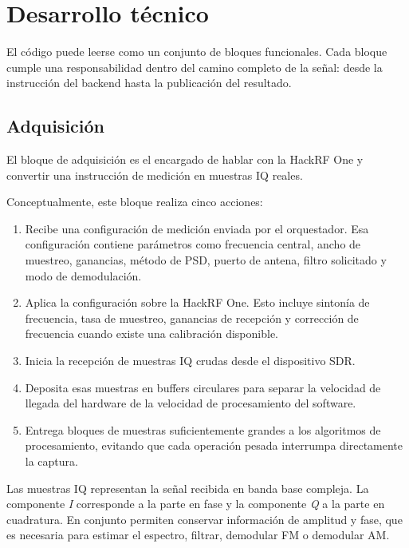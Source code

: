 \section{Desarrollo técnico}

El código puede leerse como un conjunto de bloques funcionales. Cada bloque cumple
una responsabilidad dentro del camino completo de la señal: desde la instrucción
del backend hasta la publicación del resultado.

\subsection{Adquisición}

El bloque de adquisición es el encargado de hablar con la HackRF One y convertir
una instrucción de medición en muestras IQ reales.

Conceptualmente, este bloque realiza cinco acciones:

\begin{enumerate}
  \item Recibe una configuración de medición enviada por el orquestador. Esa
  configuración contiene parámetros como frecuencia central, ancho de muestreo,
  ganancias, método de PSD, puerto de antena, filtro solicitado y modo de
  demodulación.

  \item Aplica la configuración sobre la HackRF One. Esto incluye sintonía de
  frecuencia, tasa de muestreo, ganancias de recepción y corrección de frecuencia
  cuando existe una calibración disponible.

  \item Inicia la recepción de muestras IQ crudas desde el dispositivo SDR.

  \item Deposita esas muestras en buffers circulares para separar la velocidad de
  llegada del hardware de la velocidad de procesamiento del software.

  \item Entrega bloques de muestras suficientemente grandes a los algoritmos de
  procesamiento, evitando que cada operación pesada interrumpa directamente la
  captura.
\end{enumerate}

Las muestras IQ representan la señal recibida en banda base compleja. La componente
\textit{I} corresponde a la parte en fase y la componente \textit{Q} a la parte en
cuadratura. En conjunto permiten conservar información de amplitud y fase, que es
necesaria para estimar el espectro, filtrar, demodular FM o demodular AM.

